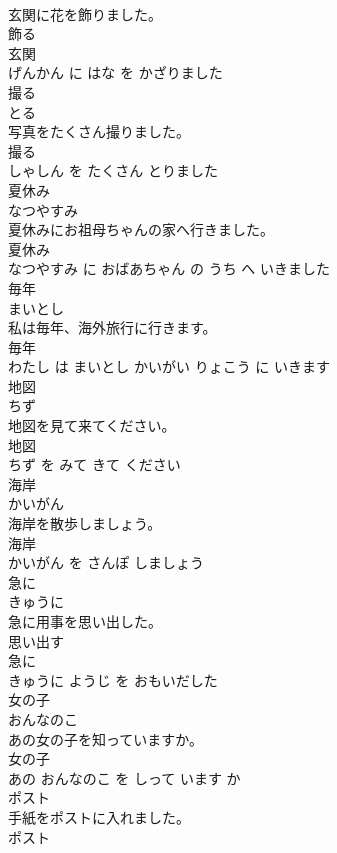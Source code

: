 \documentclass[8pt]{extreport}
\begin{document}
\begin{CJK}{UTF8}{min}
\\	玄関に花を飾りました。	
\\	飾る 
\\	玄関 
\\	げんかん に はな を かざりました			
\\	撮る	
\\	とる			
\\	写真をたくさん撮りました。	
\\	撮る 
\\	しゃしん を たくさん とりました			
\\	夏休み	
\\	なつやすみ			
\\	夏休みにお祖母ちゃんの家へ行きました。	
\\	夏休み 
\\	なつやすみ に おばあちゃん の うち へ いきました			
\\	毎年	
\\	まいとし			
\\	私は毎年、海外旅行に行きます。	
\\	毎年 
\\	わたし は まいとし かいがい りょこう に いきます			
\\	地図	
\\	ちず			
\\	地図を見て来てください。	
\\	地図 
\\	ちず を みて きて ください			
\\	海岸	
\\	かいがん			
\\	海岸を散歩しましょう。	
\\	海岸 
\\	かいがん を さんぽ しましょう			
\\	急に	
\\	きゅうに			
\\	急に用事を思い出した。	
\\	思い出す 
\\	急に 
\\	きゅうに ようじ を おもいだした			
\\	女の子	
\\	おんなのこ			
\\	あの女の子を知っていますか。	
\\	女の子 
\\	あの おんなのこ を しって います か			
\\	ポスト	
\\	手紙をポストに入れました。	
\\	ポスト 

\end{CJK}
\end{document}
